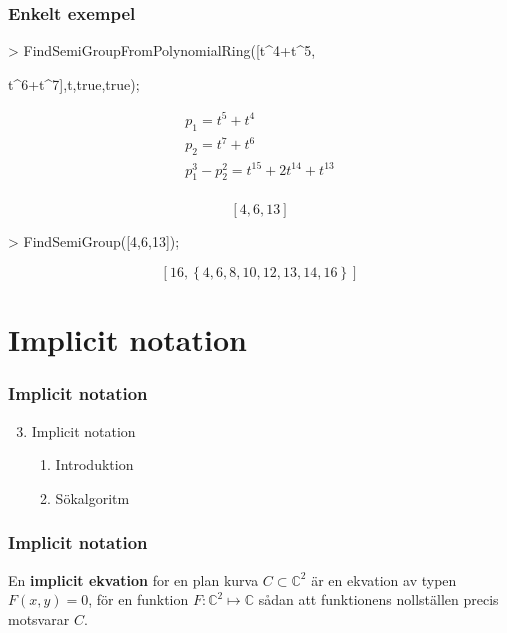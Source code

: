 \documentclass{beamer}
\begin{document}
\begin{frame}
	\frametitle{Enkelt exempel}
	
	\begin{example}
		\begin{semiverbatim}
			> FindSemiGroupFromPolynomialRing([t\^{}4+t\^{}5,

\qquad t\^{}6+t\^{}7],t,true,true);
		\end{semiverbatim}
\[\begin{array}{c}
p_1 = t^5 + t^4\\[3pt]
p_2 = t^7 + t^6\\[3pt]
p_1^3 - p_2^2 = t^{15} + 2 t^{14} + t^{13}\\
\end{array}\]

\[\left[4, 6, 13\right]\]

\begin{semiverbatim}
> FindSemiGroup([4,6,13]);
\end{semiverbatim}
\[\left[16, \left\{4, 6, 8, 10, 12, 13, 14, 16\right\}\right]\]
	\end{example}
\end{frame}



\section{Implicit notation}

\begin{frame}
	\frametitle{Implicit notation}
	\begin{enumerate}
		\setcounter{enumi}{2}
		\item<1-> Implicit notation
		\begin{enumerate}
			\item<2-> Introduktion
			\item<3-> Sökalgoritm
		\end{enumerate}
	\end{enumerate}
\end{frame}

\begin{frame}
	\frametitle{Implicit notation}
	
	\begin{definition}
		En \textbf{implicit ekvation} for en plan kurva $C \subset \mathbb{C}^2$ är en ekvation av typen $F(x,y)=0$, för en funktion $F: \mathbb{C}^2 \mapsto \mathbb{C}$ sådan att funktionens nollställen precis motsvarar $C$.
	\end{definition}
		
	\vspace{20pt}
\end{frame}
\end{document}
